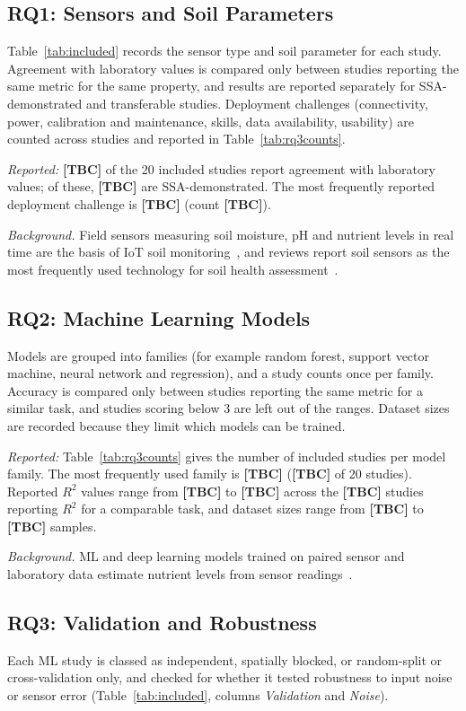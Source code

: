 \documentclass[conference]{IEEEtran}
\newcommand{\TBC}{\textbf{[TBC]}}
\begin{document}
\subsection{RQ1: Sensors and Soil Parameters}
Table~\ref{tab:included} records the sensor type and soil parameter for each
study. Agreement with laboratory values is compared only between studies
reporting the same metric for the same property, and results are reported
separately for SSA-demonstrated and transferable studies. Deployment challenges
(connectivity, power, calibration and maintenance, skills, data availability,
usability) are counted across studies and reported in
Table~\ref{tab:rq3counts}.

\emph{Reported:} \TBC{} of the 20 included studies report agreement with
laboratory values; of these, \TBC{} are SSA-demonstrated. The most frequently
reported deployment challenge is \TBC{} (count \TBC{}).

\noindent\emph{Background.} Field sensors measuring soil moisture, pH and
nutrient levels in real time are the basis of IoT soil
monitoring~\cite{ref4}, and reviews report soil sensors as the most frequently
used technology for soil health assessment~\cite{ref7}.

\subsection{RQ2: Machine Learning Models}
Models are grouped into families (for example random forest, support vector
machine, neural network and regression), and a study counts once per family.
Accuracy is compared only between studies reporting the same metric for a similar
task, and studies scoring below 3 are left out of the ranges. Dataset sizes are
recorded because they limit which models can be trained.

\emph{Reported:} Table~\ref{tab:rq3counts} gives the number of included studies
per model family. The most frequently used family is \TBC{} (\TBC{} of 20
studies). Reported $R^2$ values range from \TBC{} to \TBC{} across the \TBC{}
studies reporting $R^2$ for a comparable task, and dataset sizes range from
\TBC{} to \TBC{} samples.

\noindent\emph{Background.} ML and deep learning models trained on paired sensor
and laboratory data estimate nutrient levels from sensor
readings~\cite{ref4,ref6}.

\subsection{RQ3: Validation and Robustness}
Each ML study is classed as independent, spatially blocked, or random-split or
cross-validation only, and checked for whether it tested robustness to input
noise or sensor error (Table~\ref{tab:included}, columns
\emph{Validation} and \emph{Noise}).
\end{document}
